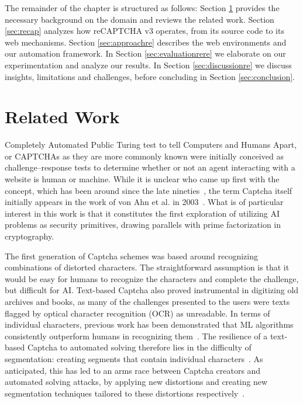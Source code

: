 The remainder of the chapter is structured as follows:
Section \ref{sec:related} provides the necessary background on the domain and reviews the related work.
Section \ref{sec:recap} analyzes how reCAPTCHA v3 operates, from its source code to its web mechanisms.
Section \ref{sec:approachre} describes the web environments and our automation framework.
In Section \ref{sec:evaluationrere} we elaborate on our experimentation and analyze our results.
In Section \ref{sec:discussionre} we discuss insights, limitations and challenges, before concluding in Section \ref{sec:conclusion}.

\section{Related Work}
\label{sec:related}

Completely Automated Public Turing test to tell Computers and Humans Apart, or CAPTCHAs as they are more commonly known were initially conceived as challenge–response tests to determine whether or not an agent interacting with a website is human or machine.
While it is unclear who came up first with the concept, which has been around since the late nineties~\cite{naor1996verification}, the term Captcha itself initially appears in the work of von Ahn et al. in 2003~\cite{von2003captcha}.
What is of particular interest in this work is that it constitutes the first exploration of utilizing AI problems as security primitives, drawing parallels with prime factorization in cryptography.

The first generation of Captcha schemes was based around recognizing combinations of distorted characters.
The straightforward assumption is that it would be easy for humans to recognize the characters and complete the challenge, but difficult for AI.
Text-based Captcha also proved instrumental in digitizing old archives and books, as many of the challenges presented to the users were texts flagged by optical character recognition (\gls{OCR}) as unreadable.
In terms of individual characters, previous work has been demonstrated that \gls{ML} algorithms consistently outperform humans in recognizing them~\cite{chellapilla2005computers}.
The resilience of a text-based Captcha to automated solving therefore lies in the difficulty of segmentation: creating segments that contain individual characters~\cite{bursztein2014end}.
As anticipated, this has led to an arms race between Captcha creators and automated solving attacks, by applying new distortions and creating new segmentation techniques tailored to these distortions respectively~\cite{cruz2012breaking}.

